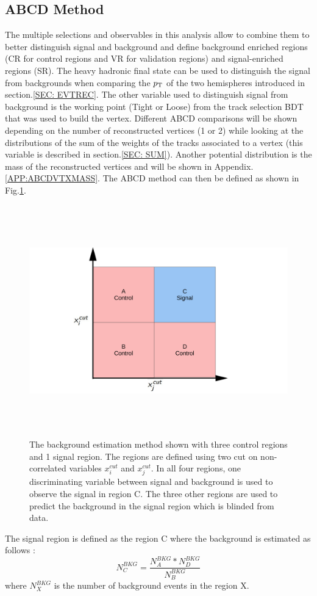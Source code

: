 \documentclass{cernatlasnote}
\newcommand{\pt}{$p_{\text T}$\xspace}
\begin{document}
    \subsection{ABCD Method}
        \label{ABCD}
        The multiple selections and observables in this analysis allow to combine them to better distinguish signal and background and define background enriched regions (CR for control regions and VR for validation regions) and signal-enriched regions (SR). The heavy hadronic final state can be used to distinguish the signal from backgrounds when comparing the \pt of the two hemispheres introduced in section.\ref{SEC: EVTREC}. The other variable used to distinguish signal from background is the working point (Tight or Loose) from the track selection BDT that was used to build the vertex. Different ABCD comparisons will be shown depending on the number of reconstructed vertices (1 or 2) while looking at the distributions of the sum of the weights of the tracks associated to a vertex (this variable is described in section.\ref{SEC: SUM}). Another potential distribution is the mass of the reconstructed vertices and will be shown in Appendix.\ref{APP:ABCDVTXMASS}. The ABCD method can then be defined as shown in Fig.\ref{fig:ABCD_sch}.
        \begin{figure}[ht]
\centering
\includegraphics[height=10cm, width=17cm, trim= 0cm 0cm 0cm 0cm,clip]{images/ABCD/ABCD.pdf}
\caption{\label{fig:ABCD_sch} The background estimation method shown with three control regions and 1 signal region. The regions are defined using two cut on non-correlated variables $x_{i}^{cut}$ and $x_{j}^{cut}$. In all four regions, one discriminating variable between signal and background is used to observe the signal in region C. The three other regions are used to predict the background in the signal region which is blinded from data.}
\end{figure}  
\FloatBarrier
        The signal region is defined as the region C where the background is estimated as follows :
        \begin{equation}
             N_{C}^{BKG} = \frac{N_{A}^{BKG}*N_{D}^{BKG}}{N_{B}^{BKG}}
        \end{equation} where $N_{X}^{BKG}$ is the number of background events in the region X.
\end{document}
